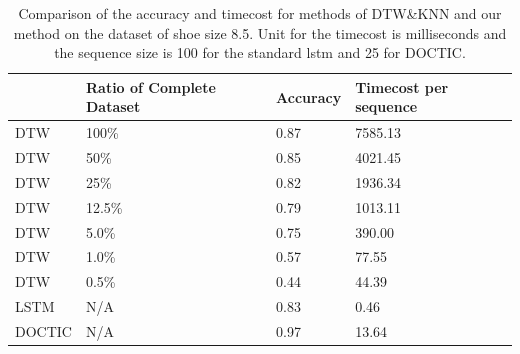 \documentclass[review]{vgtc}                 %
\begin{document}
\begin{table}[!htp]
	\def\arraystretch{1.25}
	\centering
	\begin{tabular}{C{1.5cm}C{2.3cm}C{1.5cm}C{2cm}}
		\hline
		& Ratio of Complete Dataset & Accuracy & Timecost per   sequence \\
		\hline\hline
		DTW        & 100\%                                                                 & 0.87     & 7585.13                                                           \\
		DTW        & 50\%                                                                  & 0.85     & 4021.45                                                              \\
		DTW        & 25\%                                                                  & 0.82     & 1936.34                                                              \\
		DTW        & 12.5\%                                                                  & 0.79     & 1013.11           \\  
		DTW        & 5.0\%                                                                  & 0.75     & 390.00                                                 \\
		DTW        & 1.0\%                                                                  & 0.57     & 77.55                                                 \\
		DTW        & 0.5\%                                                                  & 0.44    & 44.39                                                 \\
		LSTM & N/A                                                                   & 0.83     & 0.46          \\
		DOCTIC & N/A  & 0.97     & 13.64                                                \\\hline     
	\end{tabular}
	\caption{\label{tab:dtwlstm}Comparison of the accuracy and timecost for methods of DTW\&KNN and our method on the dataset of shoe size 8.5. Unit for the timecost is milliseconds and the sequence size is 100 for the standard \acs{lstm} and 25 for DOCTIC.}
\end{table}
\end{document}
